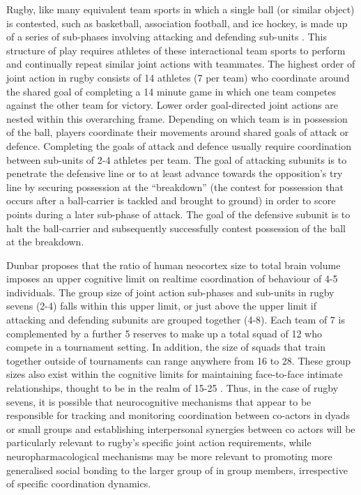 Rugby, like many equivalent team sports in which a single ball (or similar object) is contested, such as basketball, association football, and ice hockey, is made up of a series of sub-phases involving attacking and defending sub-units \citep{Passos2011}. This structure of play requires athletes of these interactional team sports to perform and continually repeat similar joint actions with teammates.   The highest order of joint action in rugby consists of 14 athletes (7 per team) who coordinate around the shared goal of completing a 14 minute game in which one team competes against the other team for victory. Lower order goal-directed joint actions are nested within this overarching frame.  Depending on which team is in possession of the ball, players coordinate their movements around shared goals of attack or defence.  Completing the goals of attack and defence usually require coordination between sub-units of 2-4 athletes per team.  The goal of attacking subunits is to penetrate the defensive line or to at least advance towards the opposition's try line by securing possession at the ``breakdown'' (the contest for possession that occurs after a ball-carrier is tackled and brought to ground) in order to score points during a later sub-phase of attack.  The goal of the defensive subunit is to halt the ball-carrier and subsequently successfully contest possession of the ball at the breakdown.

Dunbar \textcite{Dunbar1992} proposes that the ratio of human neocortex size to total brain volume imposes an upper cognitive limit on realtime coordination of behaviour of 4-5 individuals.  The group size of joint action sub-phases and sub-units in rugby sevens (2-4) falls within this upper limit, or just above the upper limit if attacking and defending subunits are grouped together (4-8). Each team of 7 is complemented by a further 5 reserves to make up a total squad of 12 who compete in a tournament setting.  In addition, the size of squads that train together outside of tournaments can range anywhere from 16 to 28.  These group sizes also exist within the cognitive limits for maintaining face-to-face intimate relationships, thought to be in the realm of 15-25 \citep{Dunbar1992,Dunbar2010}. Thus, in the case of rugby sevens, it is possible that neurocognitive mechanisms that appear to be responsible for tracking and monitoring coordination between co-actors in dyads or small groups and establishing interpersonal synergies between co actors will be particularly relevant
to rugby's specific joint action requirements, while neuropharmacological mechanisms may be more relevant to promoting more generalised social bonding to the larger group of in group members, irrespective of specific coordination dynamics.

